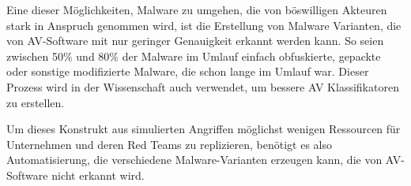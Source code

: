 Eine dieser Möglichkeiten, Malware zu umgehen, die von böswilligen Akteuren stark in Anspruch genommen wird, ist die Erstellung von Malware Varianten, die von AV-Software mit nur geringer Genauigkeit erkannt werden kann. So seien zwischen 50\%\cite{cesare_2013_malwisean, baterdene_2017_packer} und 80\% \cite{kang_2020_a} der Malware im Umlauf einfach obfuskierte, gepackte oder sonstige modifizierte Malware, die schon lange im Umlauf war. Dieser Prozess wird in der Wissenschaft auch verwendet, um bessere AV Klassifikatoren zu erstellen\cite{murali_2023_evolving}.

Um dieses Konstrukt aus simulierten Angriffen möglichst wenigen Ressourcen für Unternehmen und deren Red Teams zu replizieren, benötigt es also Automatisierung, die verschiedene Malware-Varianten erzeugen kann, die von AV-Software nicht erkannt wird.